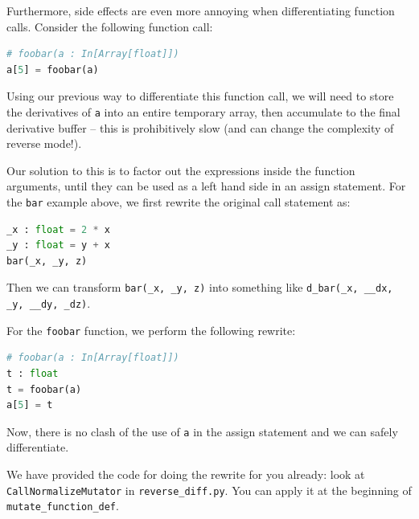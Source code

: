 Furthermore, side effects are even more annoying when differentiating function calls. Consider the following function call:
\begin{lstlisting}[language=Python]
# foobar(a : In[Array[float]])
a[5] = foobar(a)
\end{lstlisting}
Using our previous way to differentiate this function call, we will need to store the derivatives of \lstinline{a} into an entire temporary array, then accumulate to the final derivative buffer -- this is prohibitively slow (and can change the complexity of reverse mode!). 

Our solution to this is to factor out the expressions inside the function arguments, until they can be used as a left hand side in an assign statement. For the \lstinline{bar} example above, we first rewrite the original call statement as:
\begin{lstlisting}[language=Python]
_x : float = 2 * x
_y : float = y + x
bar(_x, _y, z)
\end{lstlisting}
Then we can transform \lstinline{bar(_x, _y, z)} into something like \lstinline{d_bar(_x, __dx, _y, __dy, _dz)}.

For the \lstinline{foobar} function, we perform the following rewrite:
\begin{lstlisting}[language=Python]
# foobar(a : In[Array[float]])
t : float
t = foobar(a)
a[5] = t
\end{lstlisting}
Now, there is no clash of the use of \lstinline{a} in the assign statement and we can safely differentiate.

We have provided the code for doing the rewrite for you already: look at \lstinline{CallNormalizeMutator} in \lstinline{reverse_diff.py}. You can apply it at the beginning of \lstinline{mutate_function_def}.

